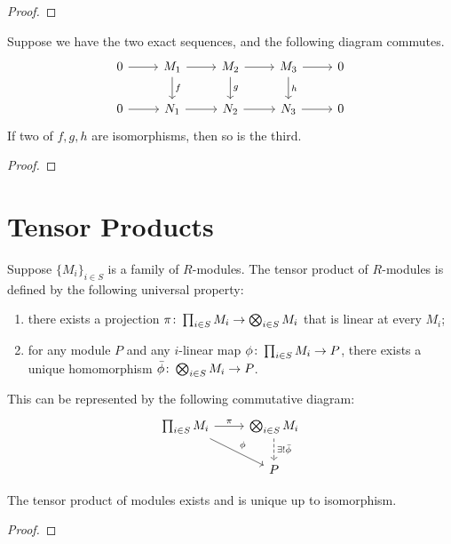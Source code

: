 \begin{proof}
    
\end{proof}
\begin{corollary}
    Suppose we have the two exact sequences,
    and the following diagram commutes.
    \begin{equation*}
        \begin{tikzcd}
            0 \arrow{r} & M_1 \arrow{d}{f} \arrow{r} &
            M_2 \arrow{d}{g} \arrow{r} & M_3 \arrow{d}{h} \arrow{r} & 0 \\
            0 \arrow{r} & N_1 \arrow{r} & N_2 \arrow{r} & N_3 \arrow{r} & 0
        \end{tikzcd}
    \end{equation*}
    If two of \(f,g,h\) are isomorphisms,
    then so is the third.
\end{corollary}
\begin{proof}
    
\end{proof}


\section{Tensor Products}

\begin{definition}
    Suppose \({\{M_i\}}_{i \in S}\) is a family of \(R\)-modules.
    The tensor product of \(R\)-modules is defined by the following universal property:
    \begin{enumerate}[label={(\roman*)}, itemsep=0mm]
        \item there exists a projection \(\pi\colon\prod_{i \in S} M_i\to\bigotimes_{i \in S} M_i\)
            that is linear at every \(M_i\);
        \item for any module \(P\) and any \(i\)-linear map \(\phi\colon\prod_{i \in S} M_i\to P\),
            there exists a unique homomorphism \(\bar{\phi}\colon\bigotimes_{i \in S} M_i\to P\).
    \end{enumerate}

    This can be represented by the following commutative diagram:
    \begin{equation*}
        \begin{tikzcd}
            \prod_{i \in S} M_i \arrow{r}{\pi} \arrow{dr}{\phi} &
            \bigotimes_{i \in S} M_i \arrow[dashrightarrow]{d}{\exists!\bar{\phi}} \\
            & P
        \end{tikzcd}
    \end{equation*}
\end{definition}
\begin{theorem}
    The tensor product of modules exists and is unique up to isomorphism.
\end{theorem}
\begin{proof}
    
\end{proof}

